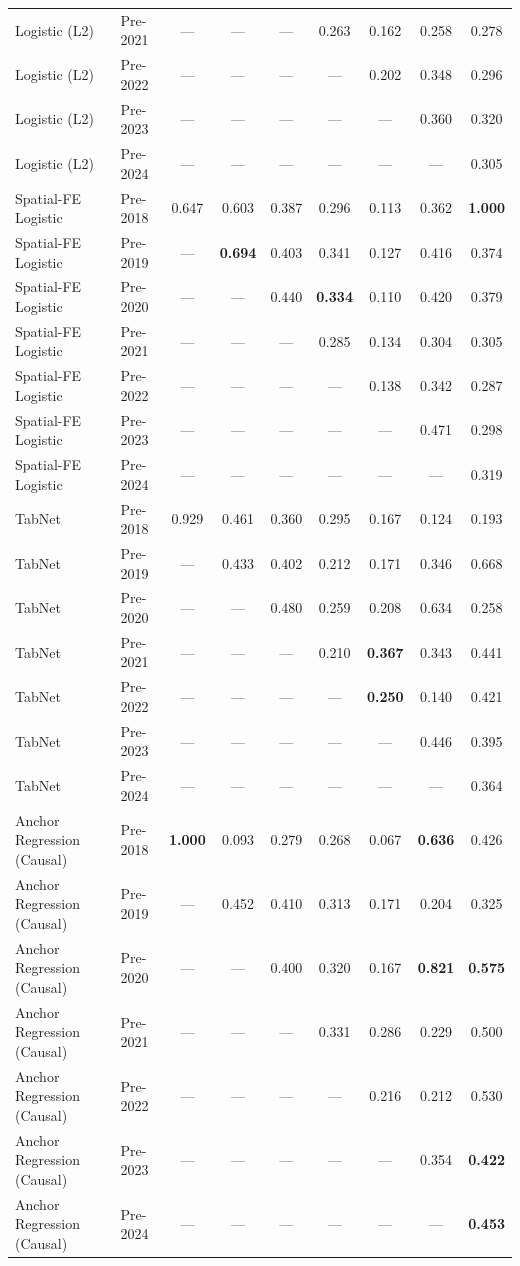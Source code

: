 \begin{table}[htbp]
{\begin{tabular}{l lccccccc}
Logistic (L2) & Pre-2021 & --- & --- & --- & 0.263 & 0.162 & 0.258 & 0.278 \\
Logistic (L2) & Pre-2022 & --- & --- & --- & --- & 0.202 & 0.348 & 0.296 \\
Logistic (L2) & Pre-2023 & --- & --- & --- & --- & --- & 0.360 & 0.320 \\
Logistic (L2) & Pre-2024 & --- & --- & --- & --- & --- & --- & 0.305 \\
Spatial-FE Logistic & Pre-2018 & 0.647 & 0.603 & 0.387 & 0.296 & 0.113 & 0.362 & \textbf{1.000} \\
Spatial-FE Logistic & Pre-2019 & --- & \textbf{0.694} & 0.403 & 0.341 & 0.127 & 0.416 & 0.374 \\
Spatial-FE Logistic & Pre-2020 & --- & --- & 0.440 & \textbf{0.334} & 0.110 & 0.420 & 0.379 \\
Spatial-FE Logistic & Pre-2021 & --- & --- & --- & 0.285 & 0.134 & 0.304 & 0.305 \\
Spatial-FE Logistic & Pre-2022 & --- & --- & --- & --- & 0.138 & 0.342 & 0.287 \\
Spatial-FE Logistic & Pre-2023 & --- & --- & --- & --- & --- & 0.471 & 0.298 \\
Spatial-FE Logistic & Pre-2024 & --- & --- & --- & --- & --- & --- & 0.319 \\
TabNet & Pre-2018 & 0.929 & 0.461 & 0.360 & 0.295 & 0.167 & 0.124 & 0.193 \\
TabNet & Pre-2019 & --- & 0.433 & 0.402 & 0.212 & 0.171 & 0.346 & 0.668 \\
TabNet & Pre-2020 & --- & --- & 0.480 & 0.259 & 0.208 & 0.634 & 0.258 \\
TabNet & Pre-2021 & --- & --- & --- & 0.210 & \textbf{0.367} & 0.343 & 0.441 \\
TabNet & Pre-2022 & --- & --- & --- & --- & \textbf{0.250} & 0.140 & 0.421 \\
TabNet & Pre-2023 & --- & --- & --- & --- & --- & 0.446 & 0.395 \\
TabNet & Pre-2024 & --- & --- & --- & --- & --- & --- & 0.364 \\
Anchor Regression (Causal) & Pre-2018 & \textbf{1.000} & 0.093 & 0.279 & 0.268 & 0.067 & \textbf{0.636} & 0.426 \\
Anchor Regression (Causal) & Pre-2019 & --- & 0.452 & 0.410 & 0.313 & 0.171 & 0.204 & 0.325 \\
Anchor Regression (Causal) & Pre-2020 & --- & --- & 0.400 & 0.320 & 0.167 & \textbf{0.821} & \textbf{0.575} \\
Anchor Regression (Causal) & Pre-2021 & --- & --- & --- & 0.331 & 0.286 & 0.229 & 0.500 \\
Anchor Regression (Causal) & Pre-2022 & --- & --- & --- & --- & 0.216 & 0.212 & 0.530 \\
Anchor Regression (Causal) & Pre-2023 & --- & --- & --- & --- & --- & 0.354 & \textbf{0.422} \\
Anchor Regression (Causal) & Pre-2024 & --- & --- & --- & --- & --- & --- & \textbf{0.453} \\
\bottomrule
\end{tabular}%
}
\end{table}